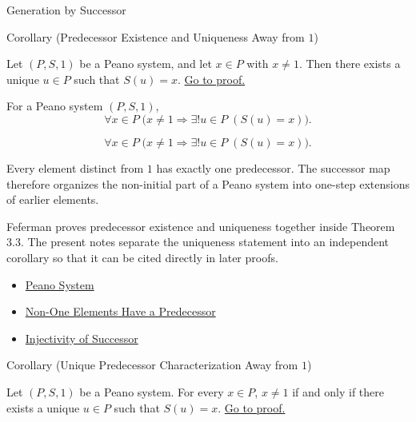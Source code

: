 \begin{topicbox}{Generation by Successor}
\begin{corollarybox}{Corollary (Predecessor Existence and Uniqueness Away from \texorpdfstring{$1$}{1})}
\begin{corollary}
\label{cor:predecessor-exists-unique-away-from-one}
Let $(P,S,1)$ be a Peano system, and let $x \in P$ with $x \neq 1$. Then
there exists a unique $u \in P$ such that $S(u)=x$.
\hyperref[prf:predecessor-exists-unique-away-from-one]{Go to proof.}
\end{corollary}
\end{corollarybox}

\begin{remark*}
For a Peano system $(P,S,1)$,
\[
\forall x \in P\;\bigl(x \neq 1 \Longrightarrow \exists! u \in P\;(S(u)=x)\bigr).
\]
\end{remark*}

\begin{remark*}
\[
\forall x \in P\;\bigl(x \neq 1 \Longrightarrow \exists! u \in P\;(S(u)=x)\bigr).
\]
\end{remark*}

\begin{remark*}[Interpretation]
Every element distinct from $1$ has exactly one predecessor. The successor map
therefore organizes the non-initial part of a Peano system into one-step
extensions of earlier elements.
\end{remark*}

\begin{remark*}
Feferman proves predecessor existence and uniqueness together inside Theorem
3.3. The present notes separate the uniqueness statement into an independent
corollary so that it can be cited directly in later proofs.
\citet{FefermanNumberSystems1964}
\end{remark*}

\begin{dependencies}
\begin{itemize}
  \item \hyperref[def:peano-system]{Peano System}
  \item \hyperref[cor:non-one-elements-have-a-predecessor]{Non-One Elements Have a Predecessor}
  \item \hyperref[ax:peano-successor-injective]{Injectivity of Successor}
\end{itemize}
\end{dependencies}

\begin{corollarybox}{Corollary (Unique Predecessor Characterization Away from \texorpdfstring{$1$}{1})}
\begin{corollary}
\label{cor:unique-predecessor-characterization-away-from-one}
Let $(P,S,1)$ be a Peano system. For every $x \in P$, $x \neq 1$ if and
only if there exists a unique $u \in P$ such that $S(u)=x$.
\hyperref[prf:unique-predecessor-characterization-away-from-one]{Go to proof.}
\end{corollary}
\end{corollarybox}


\end{topicbox}
